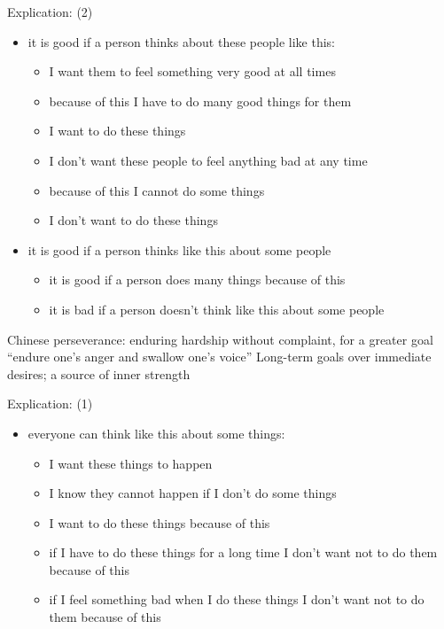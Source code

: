 \documentclass{beamer}
\begin{document}
\begin{frame}{Explication:   (2)}
  \begin{nsm}
  \begin{itemize}
  \item it is good if a person thinks about these people like this:
    \begin{itemize}
    \item I want them to feel something very good at all times
    \item because of this I have to do many good things for them
    \item I want to do these things
    \item I don't want these people to feel anything bad at any time
    \item because of this I cannot do some things
    \item I don't want to do these things
    \end{itemize}
  \item it is good if a person thinks like this about some people
    \begin{itemize}
    \item it is good if a person does many things because of this
    \item it is bad if a person doesn't think like this about some people
    \end{itemize}
  \end{itemize}
  \end{nsm}
\end{frame}

\begin{frame}{Chinese  }
  \Large
  perseverance: enduring hardship without complaint, for a greater goal
  \vfill
   
  \\ ``endure one's anger and swallow one's voice''
  \vfill
  \normalsize
  Long-term goals over immediate desires; a source of inner strength
\end{frame}

\begin{frame}{Explication:   (1)}
  \begin{nsm}
  \begin{itemize}
  \item everyone can think like this about some things:
    \begin{itemize}
    \item I want these things to happen
    \item I know they cannot happen if I don't do some things
    \item I want to do these things because of this
    \item if I have to do these things for a long time I don't want not to
      do them because of this
    \item if I feel something bad when I do these things I don't want not
      to do them because of this
    \end{itemize}
  \end{itemize}
  \end{nsm}
\end{frame}
\end{document}
